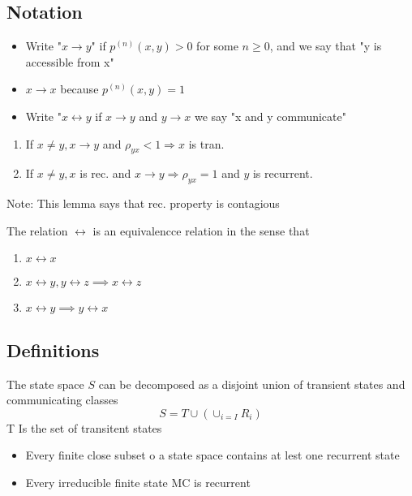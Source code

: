 \documentclass{report}
\begin{document}
  \subsection*{Notation}%
    \begin{itemize}
      \item Write "$x \to y$" if $p^{(n)}(x,y) > 0 $ for some $n \geq 0$, 
        and we say that "y is accessible from x"
      \item $x \to x$ because $p^{(n)}(x,y)  =1$
      \item Write "$ x \leftrightarrow y$ if $x \to y$ and $y \to x$
        we say "x and y communicate"
    \end{itemize}
     {
     \begin{enumerate}
       \item If $x \neq y, x \rightarrow y$ and $\rho_{y x}<1 \Rightarrow x$ is tran.
        \item If $x \neq y, x$ is rec. and $x \rightarrow y \Rightarrow \rho_{y x}=1$ and $y$ is recurrent. 
     \end{enumerate} 
     Note: This lemma says that rec. property is contagious
    }
     {
      The relation $\leftrightarrow$ is an equivalencce relation in the
      sense that
      \begin{enumerate}
        \item $x \leftrightarrow x$ 
        \item $x \leftrightarrow y, y \leftrightarrow z \implies x \leftrightarrow z$ 
        \item $x \leftrightarrow y \implies y \leftrightarrow x$ 
      \end{enumerate}
    }
    \subsection*{Definitions}%
     {
      The state space $S$ can be decomposed as a disjoint union of
      transient states and communicating classes
      \[ S = T \cup \left( \cup_{i=I} R_i \right) \]
      T Is the set of transitent states
    }
    \thm{  } {
      \begin{itemize}
        \item Every finite close subset o a state space contains at lest one recurrent state
        \item Every irreducible finite state MC is recurrent
      \end{itemize}
    }
  
\end{document}

